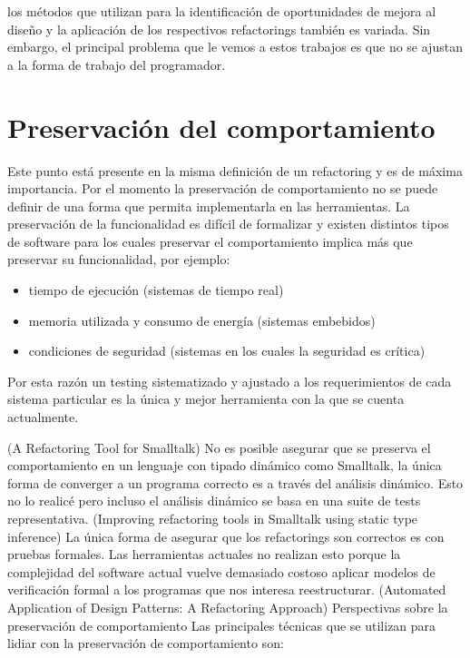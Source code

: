 los métodos que utilizan para la identificación de oportunidades de mejora al diseño y la aplicación
de los respectivos refactorings también es variada. Sin embargo, el principal problema que
le vemos a estos trabajos es que no se ajustan a la forma de trabajo del programador.





\section{Preservación del comportamiento}
Este punto está presente en la misma definición de un refactoring y es de máxima importancia. Por el
momento la preservación de comportamiento no se puede definir de una forma que permita implementarla
en las herramientas. La preservación de la funcionalidad es difícil de formalizar y existen
distintos tipos de software para los cuales preservar el comportamiento implica más que preservar su
funcionalidad, por ejemplo:

\begin{itemize}
    \item tiempo de ejecución (sistemas de tiempo real)
    \item memoria utilizada y consumo de energía (sistemas embebidos) 
    \item condiciones de seguridad (sistemas en los cuales la seguridad es crítica)
\end{itemize}

Por esta razón un testing sistematizado y ajustado a los requerimientos de cada sistema particular
es la única y mejor herramienta con la que se cuenta actualmente.

(A Refactoring Tool for Smalltalk) No es posible asegurar que se preserva el comportamiento en un
lenguaje con tipado dinámico como Smalltalk, la única forma de converger a un programa correcto es a
través del análisis dinámico. Esto no lo realicé pero incluso el análisis dinámico se basa en una
suite de tests representativa.
(Improving refactoring tools in Smalltalk using static type inference) La única forma de asegurar
que los refactorings son correctos es con pruebas formales. Las herramientas actuales no realizan
esto porque la complejidad del software actual vuelve demasiado costoso aplicar modelos de
verificación formal a los programas que nos interesa reestructurar.
(Automated Application of Design Patterns: A Refactoring Approach) Perspectivas sobre la
preservación de comportamiento Las principales técnicas que se utilizan para lidiar con la
preservación de comportamiento son:

